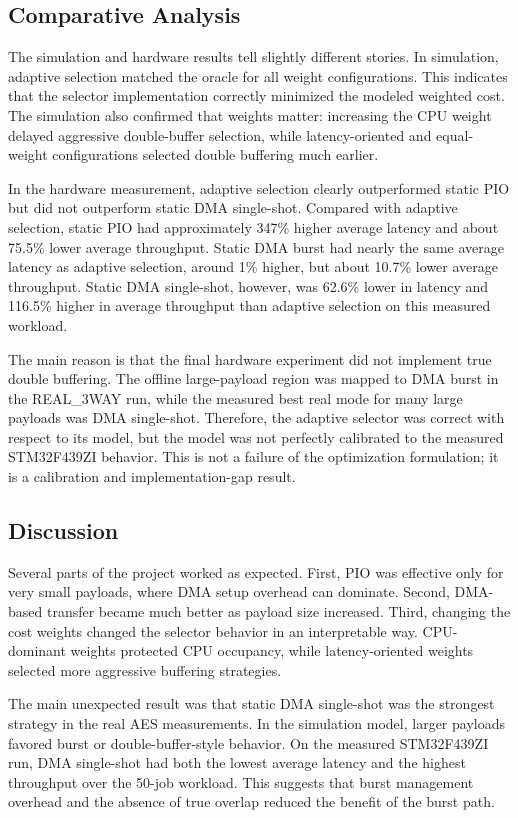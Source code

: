 \documentclass[conference]{IEEEtran}
\begin{document}
\subsection{Comparative Analysis}
The simulation and hardware results tell slightly different stories. In simulation, adaptive selection matched the oracle for all weight configurations. This indicates that the selector implementation correctly minimized the modeled weighted cost. The simulation also confirmed that weights matter: increasing the CPU weight delayed aggressive double-buffer selection, while latency-oriented and equal-weight configurations selected double buffering much earlier.

In the hardware measurement, adaptive selection clearly outperformed static PIO but did not outperform static DMA single-shot. Compared with adaptive selection, static PIO had approximately 347\% higher average latency and about 75.5\% lower average throughput. Static DMA burst had nearly the same average latency as adaptive selection, around 1\% higher, but about 10.7\% lower average throughput. Static DMA single-shot, however, was 62.6\% lower in latency and 116.5\% higher in average throughput than adaptive selection on this measured workload.

The main reason is that the final hardware experiment did not implement true double buffering. The offline large-payload region was mapped to DMA burst in the REAL\_3WAY run, while the measured best real mode for many large payloads was DMA single-shot. Therefore, the adaptive selector was correct with respect to its model, but the model was not perfectly calibrated to the measured STM32F439ZI behavior. This is not a failure of the optimization formulation; it is a calibration and implementation-gap result.

\subsection{Discussion}
Several parts of the project worked as expected. First, PIO was effective only for very small payloads, where DMA setup overhead can dominate. Second, DMA-based transfer became much better as payload size increased. Third, changing the cost weights changed the selector behavior in an interpretable way. CPU-dominant weights protected CPU occupancy, while latency-oriented weights selected more aggressive buffering strategies.

The main unexpected result was that static DMA single-shot was the strongest strategy in the real AES measurements. In the simulation model, larger payloads favored burst or double-buffer-style behavior. On the measured STM32F439ZI run, DMA single-shot had both the lowest average latency and the highest throughput over the 50-job workload. This suggests that burst management overhead and the absence of true overlap reduced the benefit of the burst path.
\end{document}
